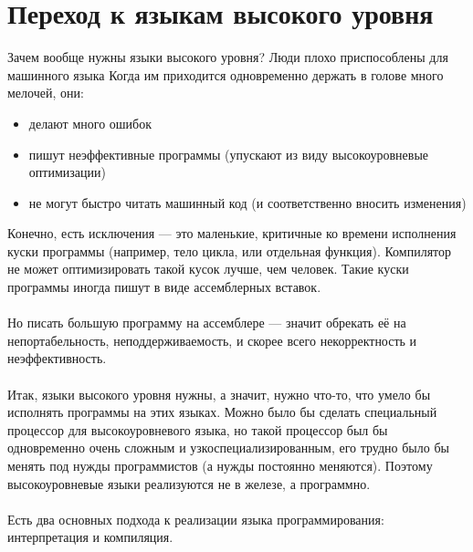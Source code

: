 \documentclass[11pt]{book}
\begin{document}
\chapter{Переход к языкам высокого уровня}
Зачем вообще нужны языки высокого уровня?
Люди плохо приспособлены для машинного языка
Когда им приходится одновременно держать в голове много мелочей, они:
\begin{itemize}
\item делают много ошибок
\item пишут неэффективные программы (упускают из виду высокоуровневые оптимизации)
\item не могут быстро читать машинный код (и соответственно вносить изменения)
\end{itemize}
Конечно, есть исключения --- это маленькие, критичные ко времени исполнения куски программы (например, тело цикла, или отдельная функция).
Компилятор не может оптимизировать такой кусок лучше, чем человек.
Такие куски программы иногда пишут в виде ассемблерных вставок.
\\ \\
Но писать большую программу на ассемблере --- значит обрекать её на непортабельность, неподдерживаемость,
и скорее всего некорректность и неэффективность.
\\ \\
Итак, языки высокого уровня нужны, а значит, нужно что-то, что умело бы исполнять программы на этих языках.
Можно было бы сделать специальный процессор для высокоуровневого языка,
но такой процессор был бы одновременно очень сложным и узкоспециализированным,
его трудно было бы менять под нужды программистов (а нужды постоянно меняются).
Поэтому высокоуровневые языки реализуются не в железе, а программно.
\\ \\
Есть два основных подхода к реализации языка программирования: интерпретация и компиляция.
\\ \\
\end{document}
